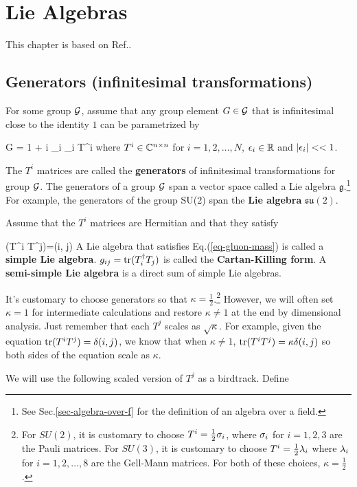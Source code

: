 \chapter{Lie Algebras}
\label{ch-lie-alg}

This chapter is based on 
Ref.\cite{birdtracks-book}.
\section{Generators (infinitesimal transformations)}

For some group
${\cal G}$, assume that any group element $G\in{\cal G}$
that is infinitesimal 
close to the identity
$1$ can be parametrized by


\beq
G = 1 + i \sum_i 
\eps_i T^i
\eeq
where $T^i\in { \mathbb{C}}^{n\times n}$
for $i=1,2, \ldots, N$,
$\epsilon_i\in{ \mathbb{R}} $
and $|\epsilon_i|<<1$.

The $T^i$ matrices are called
the {\bf generators}
of infinitesimal transformations
for group ${\cal G}$.
The generators of a group ${\cal G}$ span a vector space 
called a Lie algebra $\mathfrak{g}$.\footnote{See Sec.\ref{sec-algebra-over-f}
for the definition of an algebra over a field.
} For example,
the generators of the group SU(2) 
span the {\bf Lie algebra} $\mathfrak{su(2)}$.


Assume that the $T^i$ matrices are Hermitian and
that they satisfy

\beq
\tr(T^i T^j)=\kappa\delta(i, j)
\label{eq-gluon-mass}
\eeq
A Lie algebra that satisfies Eq.(\ref{eq-gluon-mass})
is called a {\bf simple Lie algebra}.
$g_{ij}={\rm tr }(T^\dagger_i T_j)$
is called the {\bf Cartan-Killing form}.
A {\bf semi-simple Lie algebra} is a direct
sum of simple Lie algebras.


It's customary to choose 
generators so that  $\kappa=\frac{1}{2}$.\footnote{For $SU(2)$,
it is customary to
choose $T^i =\frac{1}{2}\sigma_i$,
where $\sigma_i$ for $i=1,2,3$ are the Pauli matrices.
For $SU(3)$,
it is customary to choose $T^i=
\frac{1}{2}\lambda_i$
where $\lambda_i$
for $i=1,2, \ldots, 8$ are the Gell-Mann matrices.
For both of these choices,
$\kappa=\frac{1}{2}$.}
However, we will often set $\kappa=1$
for intermediate calculations
and restore $\kappa\neq 1$ at the end by dimensional analysis.
Just remember that each $T^j$ scales as $\sqrt{\kappa}$.
For example, given
the equation 
${\rm tr }(T^iT^j)=\delta(i,j)$,
we know that when $\kappa\neq 1$,
${\rm tr }(T^iT^j)=\kappa\delta(i,j)$
so both sides of the equation scale as $\kappa$.

We will use
the following
scaled version of $T^j$
as a birdtrack. Define

